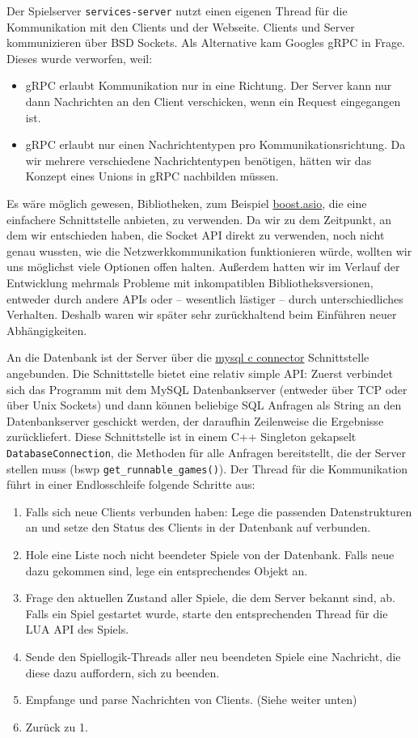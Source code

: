 Der Spielserver \texttt{services-server} nutzt einen eigenen Thread für die Kommunikation mit den Clients und
der Webseite. Clients und Server kommunizieren über BSD Sockets.
Als Alternative kam Googles gRPC in Frage. Dieses wurde verworfen, weil:
\begin{itemize}
    \item gRPC erlaubt Kommunikation nur in eine Richtung. Der Server kann nur dann Nachrichten an den Client verschicken,  wenn ein Request eingegangen ist.
    \item gRPC erlaubt nur einen Nachrichtentypen pro Kommunikationsrichtung. Da wir mehrere verschiedene Nachrichtentypen benötigen, hätten wir das Konzept eines Unions in gRPC nachbilden müssen.
\end{itemize}
Es wäre möglich gewesen, Bibliotheken, zum Beispiel \href{http://think-async.com/Asio/WebHome}{boost.asio}, die eine einfachere Schnittstelle anbieten, zu verwenden. Da wir zu dem Zeitpunkt, an dem wir entschieden haben, die Socket API direkt zu verwenden, noch nicht genau wussten, wie die Netzwerkkommunikation funktionieren würde, wollten wir uns möglichst viele Optionen offen halten. Außerdem hatten wir im Verlauf der Entwicklung mehrmals Probleme mit inkompatiblen Bibliotheksversionen, entweder durch andere APIs oder – wesentlich lästiger – durch unterschiedliches Verhalten. Deshalb waren wir später sehr zurückhaltend beim Einführen neuer Abhängigkeiten.

An die Datenbank ist der Server über die \href{https://dev.mysql.com/doc/connector-c/en/connector-c-introduction.html}{mysql c connector} Schnittstelle angebunden. Die Schnittstelle bietet eine relativ simple API: Zuerst verbindet sich das Programm mit dem MySQL Datenbankserver (entweder über TCP oder über Unix Sockets) und dann können beliebige SQL Anfragen als String an den Datenbankserver geschickt werden, der daraufhin Zeilenweise die Ergebnisse zurückliefert.
Diese Schnittstelle ist in einem C++ Singleton gekapselt \texttt{DatabaseConnection}, die Methoden für alle Anfragen
bereitstellt, die der Server stellen muss (bswp \texttt{get\_runnable\_games()}). 
\newpage
Der Thread für die Kommunikation führt in einer Endlosschleife folgende Schritte aus:
\begin{enumerate}
    \item Falls sich neue Clients verbunden haben: Lege die passenden Datenstrukturen an und setze den Status des Clients in der Datenbank auf verbunden.
    \item Hole eine Liste noch nicht beendeter Spiele von der Datenbank. Falls neue dazu gekommen sind, lege ein entsprechendes Objekt an.
    \item Frage den aktuellen Zustand aller Spiele, die dem Server bekannt sind, ab. Falls ein Spiel gestartet wurde, starte den entsprechenden Thread für die LUA API des Spiels.
    \item Sende den Spiellogik-Threads aller neu beendeten Spiele eine Nachricht, die diese dazu auffordern, sich zu beenden.
    \item Empfange und parse Nachrichten von Clients. (Siehe weiter unten)
    \item Zurück zu 1.
\end{enumerate}

